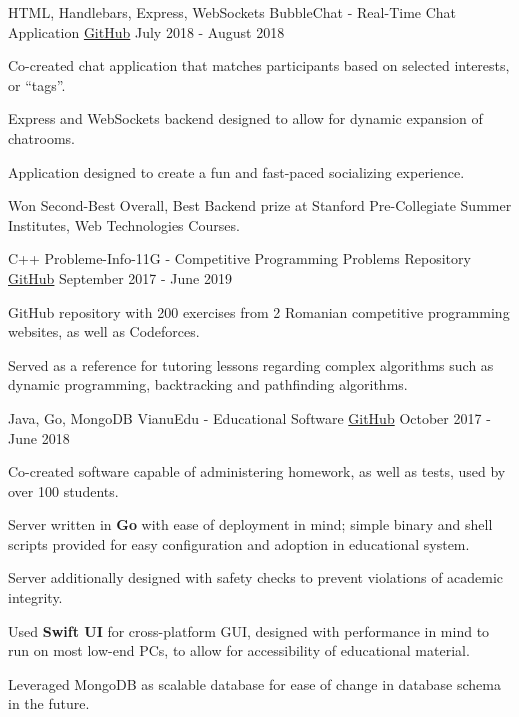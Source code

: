 
\begin{cventries}
  \cventry
    {HTML, Handlebars, Express, WebSockets}
    {BubbleChat - Real-Time Chat Application}
    {\href{https://github.com/StormFireFox1/BubbleChat}{GitHub}}
    {July 2018 - August 2018}
    {
      \begin{cvitems}
        \item {Co-created chat application that matches participants based on selected interests, or ``tags''.}
        \item {Express and WebSockets backend designed to allow for dynamic expansion of chatrooms.}
        \item {Application designed to create a fun and fast-paced socializing experience.}
        \item {Won Second-Best Overall, Best Backend prize at Stanford Pre-Collegiate Summer Institutes, Web Technologies Courses.}
      \end{cvitems}
    }
  \cventry
    {C++}
    {Probleme-Info-11G - Competitive Programming Problems Repository}
    {\href{https://github.com/StormFireFox1/Probleme-Info-11G}{GitHub}}
    {September 2017 - June 2019}
    {
      \begin{cvitems}
        \item {GitHub repository with 200 exercises from 2 Romanian competitive programming websites, as well as Codeforces.}
        \item {Served as a reference for tutoring lessons regarding complex algorithms such as dynamic programming, backtracking and pathfinding algorithms.}
      \end{cvitems}
    }
  \cventry
    {Java, Go, MongoDB}
    {VianuEdu - Educational Software}
    {\href{https://github.com/CNITV/VianuEdu}{GitHub}}
    {October 2017 - June 2018}
    {
      \begin{cvitems}
        \item {Co-created software capable of administering homework, as well as tests, used by over 100 students.}
        \item {Server written in \textbf{Go} with ease of deployment in mind; simple binary and shell scripts provided for easy configuration and adoption in educational system.}
        \item {Server additionally designed with safety checks to prevent violations of academic integrity.}
        \item {Used \textbf{Swift UI} for cross-platform GUI, designed with performance in mind to run on most low-end PCs, to allow for accessibility of educational material.}
        \item {Leveraged MongoDB as scalable database for ease of change in database schema in the future.}
      \end{cvitems}
    }
\end{cventries}
